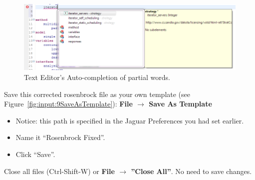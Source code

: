 \begin{figure}[htbp]
  \centering
  \includegraphics[scale=0.6]{images/8iterato}
  \caption{Text Editor's Auto-completion of partial words.}
  \label{fig:input:8iterato}
\end{figure}


Save this corrected rosenbrock file as your own template (see Figure~\ref{fig:input:9SaveAsTemplate}):
{\bf File $\rightarrow$ Save As Template}
\begin{itemize}
\item Notice: this path is specified in the Jaguar Preferences you had set earlier.
\item Name it ``Rosenbrock Fixed''.
\item Click ``Save''.
\end{itemize} 

Close all files (Ctrl-Shift-W) or {\bf File $\rightarrow$ ''Close All''}. No need to save changes.


